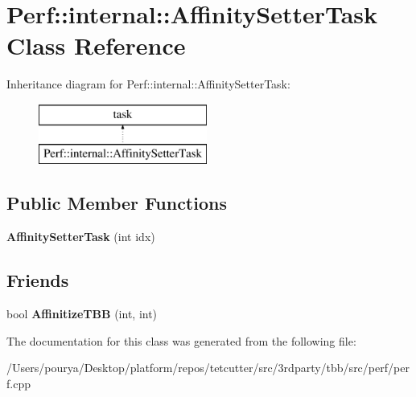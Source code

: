 \hypertarget{classPerf_1_1internal_1_1AffinitySetterTask}{}\section{Perf\+:\+:internal\+:\+:Affinity\+Setter\+Task Class Reference}
\label{classPerf_1_1internal_1_1AffinitySetterTask}
Inheritance diagram for Perf\+:\+:internal\+:\+:Affinity\+Setter\+Task\+:\begin{figure}[H]
\begin{center}
\leavevmode
\includegraphics[height=2.000000cm]{classPerf_1_1internal_1_1AffinitySetterTask}
\end{center}
\end{figure}
\subsection*{Public Member Functions}
\begin{DoxyCompactItemize}
\item 
\hypertarget{classPerf_1_1internal_1_1AffinitySetterTask_ac180278389f74c02b13dc98191b8e025}{}{\bfseries Affinity\+Setter\+Task} (int idx)\label{classPerf_1_1internal_1_1AffinitySetterTask_ac180278389f74c02b13dc98191b8e025}

\end{DoxyCompactItemize}
\subsection*{Friends}
\begin{DoxyCompactItemize}
\item 
\hypertarget{classPerf_1_1internal_1_1AffinitySetterTask_aa5fb989d531f9cedabf8e68f7ee21ef4}{}bool {\bfseries Affinitize\+T\+B\+B} (int, int)\label{classPerf_1_1internal_1_1AffinitySetterTask_aa5fb989d531f9cedabf8e68f7ee21ef4}

\end{DoxyCompactItemize}


The documentation for this class was generated from the following file\+:\begin{DoxyCompactItemize}
\item 
/\+Users/pourya/\+Desktop/platform/repos/tetcutter/src/3rdparty/tbb/src/perf/perf.\+cpp\end{DoxyCompactItemize}
